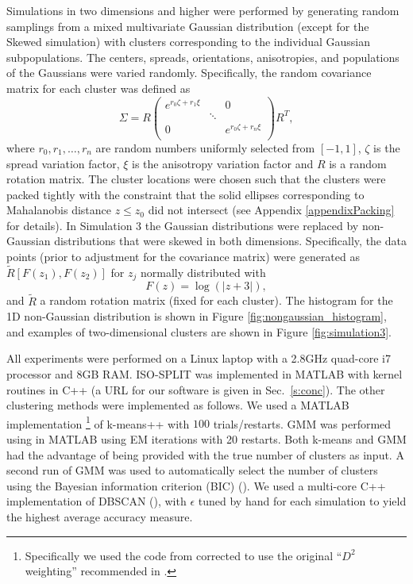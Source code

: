 \documentclass[10pt]{article}
\begin{document}
Simulations in two dimensions and higher were performed by generating random samplings from a mixed multivariate Gaussian distribution (except for the Skewed simulation) with clusters corresponding to the individual Gaussian subpopulations. The centers, spreads, orientations, anisotropies, and populations of the Gaussians were varied randomly. Specifically, the random covariance matrix for each cluster was defined as
\[
\Sigma=R
\left(
\begin{array}{ccc}
e^{r_0\zeta + r_1\xi} & & 0 \\
 & \ddots &  \\
 0 &  & e^{r_0\zeta + r_n\xi} \\
\end{array}
\right)R^T,
\]
where $r_0,r_1,\dots,r_n$ are random numbers uniformly selected from $[-1,1]$, $\zeta$ is the spread variation factor, $\xi$ is the anisotropy variation factor and $R$ is a random rotation matrix. The cluster locations were chosen such that the clusters were packed tightly with the constraint that the solid ellipses corresponding to Mahalanobis distance $z\leq z_0$ did not intersect (see Appendix \ref{appendixPacking} for details). In Simulation 3 the Gaussian distributions were replaced by non-Gaussian distributions that were skewed in both dimensions. Specifically, the data points (prior to adjustment for the covariance matrix) were generated as $\tilde{R}[F(z_1),F(z_2)]$ for $z_j$ normally distributed with
\begin{equation}
\label{eq:nongaussian}F(z)=\log(|z+3|),
\end{equation}
and $\tilde{R}$ a random rotation matrix (fixed for each cluster). The histogram for the 1D non-Gaussian distribution is shown in Figure \ref{fig:nongaussian_histogram}, and examples of two-dimensional clusters are shown in Figure \ref{fig:simulation3}.

All experiments were performed on a Linux laptop with a 2.8GHz quad-core
i7 processor and 8GB RAM.
ISO-SPLIT was implemented in MATLAB with kernel routines in C++
(a URL for our software is given in Sec.~\ref{s:conc}).
The other clustering methods were implemented as follows.
We used a MATLAB implementation%
\footnote{Specifically we used the code from \cite{kmeanspp_sorber} corrected to use
  the original ``$D^2$ weighting'' recommended in \cite{kmeanspp}.}
 of k-means++
 with $100$ trials/restarts. GMM was performed using \cite{vlfeat} in MATLAB using EM iterations with 20 restarts. Both k-means and GMM had the advantage of being provided with the true number of clusters as input. A second run of GMM was used to automatically select the number of clusters using the Bayesian information criterion (BIC) (\cite{BIC}). We used a multi-core C++ implementation of DBSCAN (\cite{dbscan_dbp}), with $\epsilon$ tuned by hand for each simulation to yield the highest average accuracy measure.
\end{document}
